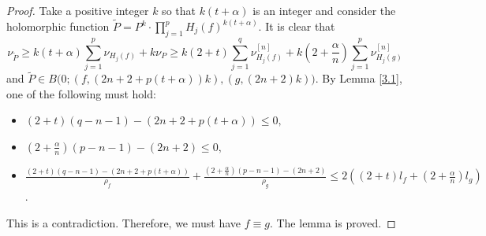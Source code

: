 \documentclass[12pt, a4paper, oneside]{amsart}
\numberwithin{equation}{section}
\begin{document}
\begin{proof}
Take a positive integer $k$ so that $k(t+\alpha)$ is an integer and consider the holomorphic function $\tilde P=P^k\cdot\prod_{j=1}^{p}H_j(f)^{k(t+\alpha)}.$ It is clear that
$$ \nu_{\tilde P}\ge k(t+\alpha)\sum_{j=1}^p\nu_{H_j(f)}+k\nu_P\ge k(2+t)\sum_{j=1}^q\nu^{[n]}_{H_j(f)}+k\left(2+\frac{\alpha}{n}\right)\sum_{j=1}^p\nu^{[n]}_{H_j(g)}$$
and $\tilde P\in B\big(0;(f,(2n+2+p(t+\alpha))k),(g,(2n+2)k)\big)$. By Lemma \ref{3.1}, one of the following must hold:
\begin{itemize}
\item $(2+t)(q-n-1)-(2n+2+p(t+\alpha))\le 0,$
\item $\left(2+\frac{\alpha}{n}\right)(p-n-1)-(2n+2)\le 0,$
\item $\frac{(2+t)(q-n-1)-(2n+2+p(t+\alpha))}{\rho_f}+\frac{\left(2+\frac{\alpha}{n}\right)(p-n-1)-(2n+2)}{\rho_g}\le 2\left((2+t)l_f+(2+\frac{\alpha}{n})l_g\right)$.
\end{itemize}
This is a contradiction. Therefore, we must have $f\equiv g$. The lemma is proved.
\end{proof}
\end{document}
